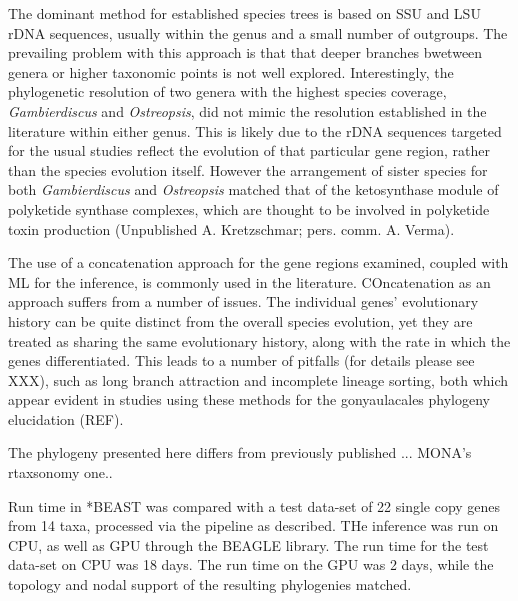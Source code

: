 \documentclass[12pt]{article}
\begin{document}
The dominant method for established species trees is based on SSU and LSU rDNA sequences, usually within the genus and a small number of outgroups. The prevailing problem with this approach is that that deeper branches bwetween genera or higher taxonomic points is not well explored. Interestingly, the phylogenetic resolution of two genera with the highest species coverage, \emph{Gambierdiscus} and \emph{Ostreopsis}, did not mimic the resolution established in the literature within either genus. This is likely due to the rDNA sequences targeted for the usual studies reflect the evolution of that particular gene region, rather than the species evolution itself. However the arrangement of sister species for both \emph{Gambierdiscus} and \emph{Ostreopsis} matched that of the ketosynthase module of polyketide synthase complexes, which are thought to be involved in polyketide toxin production (Unpublished A. Kretzschmar; pers. comm. A. Verma). 

The use of a concatenation approach for the gene regions examined, coupled with ML for the inference, is commonly used in the literature. COncatenation as an approach suffers from a number of issues. The individual genes' evolutionary history can be quite distinct from the overall species evolution, yet they are treated as sharing the same evolutionary history, along with the rate in which the genes differentiated. This leads to a number of pitfalls (for details please see XXX), such as long branch attraction and incomplete lineage sorting, both which appear evident in studies using these methods for the gonyaulacales phylogeny elucidation (REF).


The phylogeny presented here differs from previously published ... MONA's rtaxsonomy one..

Run time in *BEAST was compared with a test data-set of 22 single copy genes from 14 taxa, processed via the pipeline as described. THe inference was run on CPU, as well as GPU through the BEAGLE library.
The run time for the test data-set on CPU was 18 days. The run time on the GPU was 2 days, while the topology and nodal support of the resulting phylogenies matched.


\newpage
\end{document}
